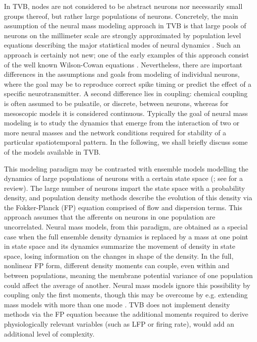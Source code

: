 \documentclass{bioinfo}
\begin{document}
	In TVB, nodes are not considered to be abstract neurons nor necessarily
	small groups thereof, but rather large populations of neurons. Concretely,
	the main assumption of the neural mass modeling approach in TVB is that
	large pools of neurons on the millimeter scale are strongly approximated
	by population level equations describing the major statistical modes of
	neural dynamics \citep{Freeman_1975book}. Such an approach is certainly not
	new; one of the early examples of this approach consist of the well known
	Wilson-Cowan equations \citep{Wilson_1973}. Nevertheless, there are
	important differences in the assumptions and goals from modeling of
	individual neurons, where the goal may be to reproduce correct spike
	timing or predict the effect of  a specific neurotransmitter. A second
	difference lies in coupling: chemical coupling is often assumed to be
	pulsatile, or discrete, between neurons, whereas for mesoscopic models it is considered
	continuous. Typically the goal of neural mass modeling is to study the
	dynamics that emerge from the interaction of two or more neural masses and
	the network conditions required for stability of a particular
	spatiotemporal pattern. In the following, we shall  briefly discuss some
	of the models available in TVB.

	This modeling paradigm may be contrasted with ensemble models modelling
	the dynamics of large populations of neurons with a certain state space
	(\cite{de1993stochastical, omurtag2000simulation, knight2000dynamics, gerstner2000population};
	see \cite{Deco_2008a} for a review).
	The large number of neurons impart the state
	space with a probability density, and population density methods describe the
	evolution of this density via the Fokker-Planck (FP) equation \citep{risken1996fokker}
	comprised of flow and dispersion terms.  This approach assumes
	that the afferents on neurons in one population are uncorrelated.
	Neural mass models, from this paradigm, are obtained as a special case
	when the full ensemble density dynamics is replaced by a mass at one
	point in state space and its dynamics summarize the movement of density
	in state space, losing information on the changes in shape of the
	density.  In the full, nonlinear FP form, different density moments can
	couple, even within and between populations, meaning the membrane
	potential variance of one population could affect the average of
	another. Neural mass models ignore this possibility by coupling only
	the first moments, though this may be overcome by e.g. extending mass
	models with more than one mode 
	\citep{Stefanescu_2008, Stefanescu_2011}. 
	TVB does not implement density methods via the FP
	equation because the additional moments required to derive
	physiologically relevant variables (such as LFP or firing rate), would
	add an additional level of complexity.  
\end{document}
